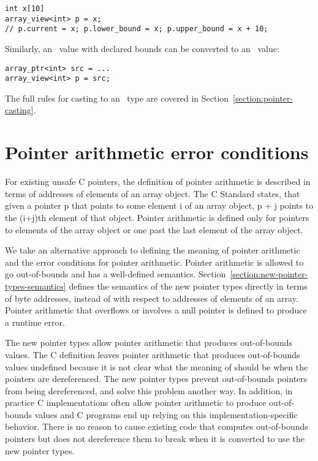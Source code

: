 \begin{verbatim}
int x[10]
array_view<int> p = x; 
// p.current = x; p.lower_bound = x; p.upper_bound = x + 10;

\end{verbatim}

Similarly, an \arrayptr\ value with declared bounds can be
converted to an \arrayview\ value:

\begin{verbatim}
array_ptr<int> src = ...
array_view<int> p = src;
\end{verbatim}

The full rules for casting to an \arrayview\ type are covered
in Section~\ref{section:pointer-casting}.

\section{Pointer arithmetic error conditions}
\label{section:pointer-arithmetic-errors}

For existing unsafe C pointers, the definition of pointer arithmetic is
described in terms of addresses of elements of an array object. The C
Standard \cite{ISO2011} states, that given a pointer p that points to some element i of
an array object, p + j points to the (i+j)th element of that object.
Pointer arithmetic is defined only for pointers to elements of the array
object or one past the last element of the array object.

We take an alternative approach to defining the meaning of pointer
arithmetic and the error conditions for pointer arithmetic. Pointer
arithmetic is allowed to go out-of-bounds and has a well-defined
semantics. Section~\ref{section:new-pointer-types-semantics}
defines the semantics of the new pointer types
directly in terms of byte addresses, instead of with respect to
addresses of elements of an array. Pointer arithmetic that overflows or
involves a null pointer is defined to produce a runtime error.

The new pointer types allow pointer arithmetic that produces
out-of-bounds values. The C definition leaves pointer arithmetic that
produces out-of-bounds values undefined because it is not clear what the
meaning of should be when the pointers are dereferenced. The new pointer
types prevent out-of-bounds pointers from being dereferenced, and solve
this problem another way. In addition, in practice C implementations
often allow pointer arithmetic to produce out-of-bounds values and C
programs end up relying on this implementation-specific behavior. There
is no reason to cause existing code that computes out-of-bounds pointers
but does not dereference them to break when it is converted to use the
new pointer types.

